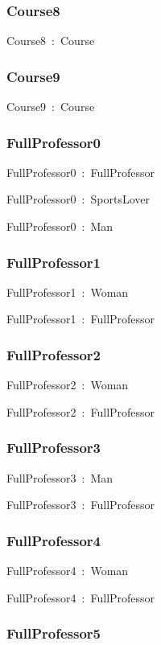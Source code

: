 \documentclass{article}
\begin{document}
\subsubsection*{Course8}

Course8~:~Course

\subsubsection*{Course9}

Course9~:~Course

\subsubsection*{FullProfessor0}

FullProfessor0~:~FullProfessor

FullProfessor0~:~SportsLover

FullProfessor0~:~Man

\subsubsection*{FullProfessor1}

FullProfessor1~:~Woman

FullProfessor1~:~FullProfessor

\subsubsection*{FullProfessor2}

FullProfessor2~:~Woman

FullProfessor2~:~FullProfessor

\subsubsection*{FullProfessor3}

FullProfessor3~:~Man

FullProfessor3~:~FullProfessor

\subsubsection*{FullProfessor4}

FullProfessor4~:~Woman

FullProfessor4~:~FullProfessor

\subsubsection*{FullProfessor5}
\end{document}
